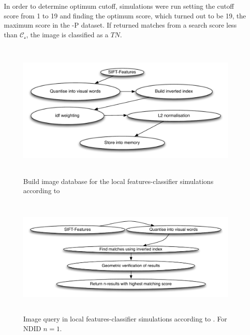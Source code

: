 \documentclass[english,12pt,a4paper,pdftex,elec,utf8, table]{aaltothesis}
\begin{document}
In order to determine optimum cutoff, simulations were run setting the cutoff score from 1 to 19 and finding the optimum score, which turned out to be 19, the maximum score in the -P dataset. If returned matches from a search score less than $\mathcal{C_s}$, the image is classified as a $TN$.

\begin{figure}[htb]
\begin{center}
  \includegraphics[height=7cm]{figures/vedaldigenindex}
\end{center}
\caption{Build image database for the local features-classifier simulations according to \cite{Vedaldi2012}}
\label{vedaldigenindex}
\end{figure}

\begin{figure}[htb]
\begin{center}
\includegraphics[height=6cm]{figures/vedaldiquery}
\end{center}
\caption{Image query in local features-classifier simulations according to \cite{Vedaldi2012}. For NDID $n=1$.}
\label{vedaldiquery}
\end{figure}
\end{document}
